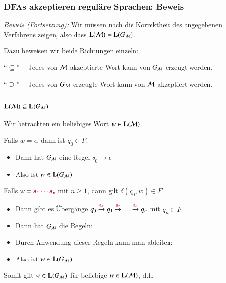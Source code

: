 \documentclass[onlymath]{beamer}
\begin{document}
\begin{frame}\frametitle{DFAs akzeptieren reguläre Sprachen: Beweis}

\bigskip


\emph{Beweis (Fortsetzung):} Wir müssen noch die Korrektheit des angegebenen Verfahrens zeigen, also dass $\textbf{\textcolor{black}{L}}(\mathcal{M})=\textbf{\textcolor{black}{L}}(G_{\mathcal{M}})$.
\medskip

Dazu beweisen wir beide Richtungen einzeln:
\bigskip

\alert{"`$\subseteq$"'}~~ Jedes von $\mathcal{M}$ akzeptierte Wort kann von $G_{\mathcal{M}}$ erzeugt werden.
\bigskip

\alert{"`$\supseteq$"'}~~ Jedes von $G_{\mathcal{M}}$ erzeugte Wort kann von $\mathcal{M}$ akzeptiert werden.

\end{frame}

\begin{frame}\frametitle{$\textbf{\textcolor{black}{L}}(\mathcal{M})\subseteq\textbf{\textcolor{black}{L}}(G_{\mathcal{M}})$}

Wir betrachten ein beliebiges Wort $w\in\textbf{\textcolor{black}{L}}(\mathcal{M})$.\pause
\medskip

Falls $w=\epsilon$, dann ist $q_0\in F$.\pause
\begin{itemize}
\item Dann hat $G_{\mathcal{M}}$ eine Regel $q_0\to\epsilon$
\item Also ist $w\in\textbf{\textcolor{black}{L}}(G_{\mathcal{M}})$\pause
\end{itemize}
\medskip

Falls $w=\mathtt{\textcolor{purple}{a_1\cdots a_n}}$ mit $n\geq 1$, dann gilt $\delta(q_0,w)\in F$.\pause
\begin{itemize}
\item Dann gibt es Übergänge $q_0 \stackrel{\mathtt{\textcolor{purple}{a_1}}}{\to} q_1 \stackrel{\mathtt{\textcolor{purple}{a_2}}}{\to} \ldots \stackrel{\mathtt{\textcolor{purple}{a_n}}}{\to} q_n$ mit $q_n\in F$\pause
\item Dann hat $G_{\mathcal{M}}$ die Regeln: \\[1ex]
	\pause
\item Durch Anwendung dieser Regeln kann man ableiten:\\[1ex]
	\pause
\item Also ist $w\in\textbf{\textcolor{black}{L}}(G_{\mathcal{M}})$.
\end{itemize}

Somit gilt $w\in\textbf{\textcolor{black}{L}}(G_{\mathcal{M}})$ für beliebige $w\in\textbf{\textcolor{black}{L}}(\mathcal{M})$, d.h.

\end{frame}
\end{document}
